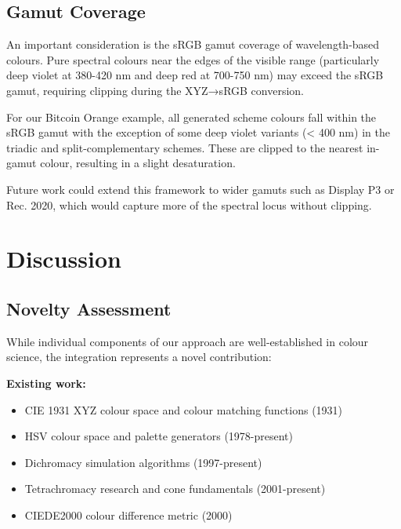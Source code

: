 \documentclass[12pt,a4paper]{article}
\begin{document}
\subsection{Gamut Coverage}

An important consideration is the sRGB gamut coverage of wavelength-based colours. Pure spectral colours near the edges of the visible range (particularly deep violet at 380-420 nm and deep red at 700-750 nm) may exceed the sRGB gamut, requiring clipping during the XYZ→sRGB conversion.

For our Bitcoin Orange example, all generated scheme colours fall within the sRGB gamut with the exception of some deep violet variants (< 400 nm) in the triadic and split-complementary schemes. These are clipped to the nearest in-gamut colour, resulting in a slight desaturation.

Future work could extend this framework to wider gamuts such as Display P3 or Rec. 2020, which would capture more of the spectral locus without clipping.

\section{Discussion}
\label{sec:discussion}

\subsection{Novelty Assessment}

While individual components of our approach are well-established in colour science, the integration represents a novel contribution:

\textbf{Existing work:}
\begin{itemize}
\item CIE 1931 XYZ colour space and colour matching functions (1931) \cite{cie1932commission}
\item HSV colour space and palette generators (1978-present) \cite{smith1978color}
\item Dichromacy simulation algorithms (1997-present) \cite{brettel1997computerized,vienot1999digital}
\item Tetrachromacy research and cone fundamentals (2001-present) \cite{jameson2001richer,jordan2010neural}
\item CIEDE2000 colour difference metric (2000) \cite{sharma2005ciede2000}
\end{itemize}
\end{document}
